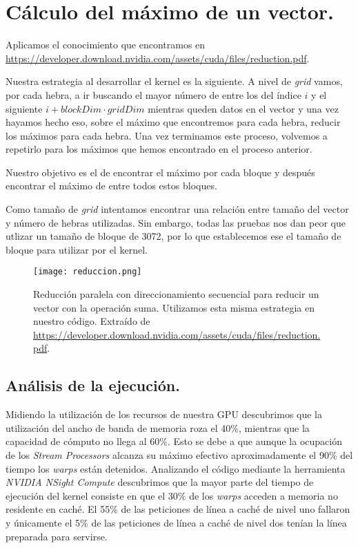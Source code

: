 \section{Cálculo del máximo de un vector.}

Aplicamos el conocimiento que encontramos en \url{https://developer.download.nvidia.com/assets/cuda/files/reduction.pdf}.

Nuestra estrategia al desarrollar el kernel es la siguiente.
A nivel de \textit{grid} vamos, por cada hebra, a ir buscando
el mayor número de entre los del índice $i$ y el siguiente
$i+blockDim\cdot gridDim$ mientras queden datos en el vector y una
vez hayamos hecho eso, sobre el máximo que encontremos para cada hebra,
reducir los máximos para cada hebra. Una vez terminamos este proceso,
volvemos a repetirlo para los máximos que hemos encontrado en el proceso
anterior.

Nuestro objetivo es el de encontrar el máximo por cada bloque y
después encontrar el máximo de entre todos estos bloques.

Como tamaño de \textit{grid} intentamos encontrar una relación entre tamaño del vector y
número de hebras utilizadas. Sin embargo, todas las pruebas nos dan peor que utlizar un tamaño
de bloque de 3072, por lo que establecemos ese el tamaño de bloque para utilizar por el kernel.

\begin{figure}[H]
    \centering
    \texttt{[image: reduccion.png]}
    \caption{Reducción paralela con direccionamiento secuencial para reducir un vector con la operación suma.
        Utilizamos esta misma estrategia en nuestro código.
        Extraído de \url{https://developer.download.nvidia.com/assets/cuda/files/reduction.pdf}.}
\end{figure}

\subsection{Análisis de la ejecución.}

Midiendo la utilización de los recursos de nuestra GPU descubrimos que la utilización del ancho de banda de memoria roza el
40\%, mientras que la capacidad de cómputo no llega al 60\%. Esto se debe a que aunque la ocupación de los \textit{Stream Processors}
alcanza su máximo efectivo aproximadamente el 90\% del tiempo los \textit{warps} están detenidos.
Analizando el código mediante la herramienta \textit{NVIDIA NSight Compute} descubrimos que la mayor parte del tiempo de ejecución
del kernel consiste en que el 30\% de los \textit{warps} acceden a memoria no residente en caché. El 55\% de las peticiones
de línea a caché de nivel uno fallaron y únicamente el 5\% de las peticiones de línea a caché de nivel dos tenían la línea preparada
para servirse.

